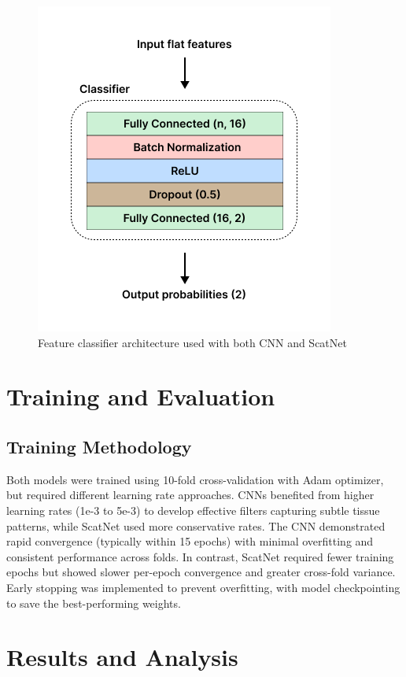\documentclass[10pt,twocolumn]{article}
\begin{document}
\begin{figure}[h]
\centering
\includegraphics[width=0.8\columnwidth]{imgs/classifier_arch.png}
\caption{Feature classifier architecture used with both CNN and ScatNet}
\label{fig:classifier_arch}
\end{figure}

\section{Training and Evaluation}
\subsection{Training Methodology}
Both models were trained using 10-fold cross-validation with Adam optimizer, but required different learning rate approaches. CNNs benefited from higher learning rates (1e-3 to 5e-3) to develop effective filters capturing subtle tissue patterns, while ScatNet used more conservative rates. The CNN demonstrated rapid convergence (typically within 15 epochs) with minimal overfitting and consistent performance across folds. In contrast, ScatNet required fewer training epochs but showed slower per-epoch convergence and greater cross-fold variance. Early stopping was implemented to prevent overfitting, with model checkpointing to save the best-performing weights.

\section{Results and Analysis}
\end{document}
